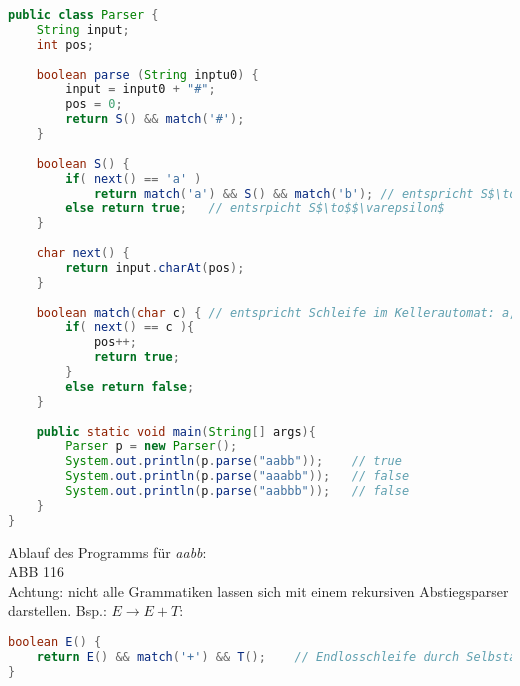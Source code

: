 \begin{lstlisting}[language=java]
public class Parser {
	String input;
	int pos;
	
	boolean parse (String inptu0) {
		input = input0 + "#";
		pos = 0;
		return S() && match('#');
	}
	
	boolean S() {	
		if( next() == 'a' )
			return match('a') && S() && match('b');	// entspricht S$\to$aSb
		else return true;	// entsrpicht S$\to$$\varepsilon$
	}
	
	char next() {
		return input.charAt(pos);
	}
	
	boolean match(char c) {	// entspricht Schleife im Kellerautomat: a,a/$\varepsilon$ und b,b/$\varepsilon$ bzw. S,$\varepsilon$/aSb
		if( next() == c ){
			pos++;
			return true;
		}
		else return false;
	}
	
	public static void main(String[] args){
		Parser p = new Parser();
		System.out.println(p.parse("aabb"));	// true
		System.out.println(p.parse("aaabb"));	// false
		System.out.println(p.parse("aabbb"));	// false
	}
}
\end{lstlisting}
Ablauf des Programms für \emph{aabb}:\\
ABB 116\\
Achtung: nicht alle Grammatiken lassen sich mit einem rekursiven Abstiegsparser darstellen. Bsp.: $E\to E+T$:
\begin{lstlisting}[language=java]
boolean E() {
	return E() && match('+') && T();	// Endlosschleife durch Selbstaufruf
}	
\end{lstlisting}
\newpage
\printbibliography

